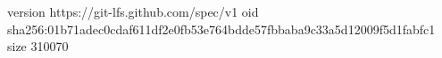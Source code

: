 version https://git-lfs.github.com/spec/v1
oid sha256:01b71adec0cdaf611df2e0fb53e764bdde57fbbaba9c33a5d12009f5d1fabfc1
size 310070
